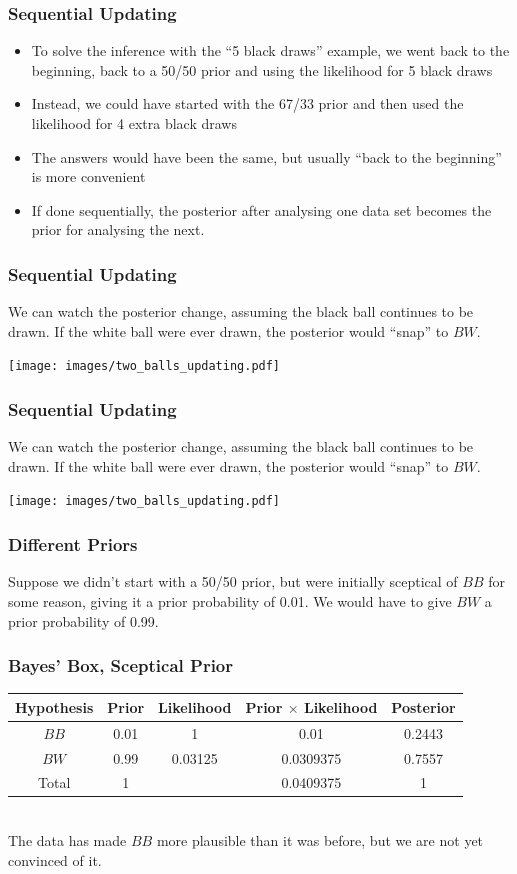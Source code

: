 \documentclass{beamer}
\begin{document}
\begin{frame}
\frametitle{Sequential Updating}

\begin{itemize}
\item To solve the inference with the ``5 black draws'' example,
we went back to the beginning, back to a 50/50 prior and
using the likelihood for 5 black draws\pause
\item Instead, we could have started with the 67/33 prior and then used
the likelihood for 4 extra black draws\pause
\item  The answers would have been the same, but usually
``back to the beginning'' is more convenient\pause
\item If done sequentially, 
the posterior after analysing one data set becomes
the prior for analysing the next.
\end{itemize}


\end{frame}

\begin{frame}
\frametitle{Sequential Updating}
We can watch the posterior change, assuming the black ball continues to be
drawn. If the white ball were ever drawn, the posterior would ``snap'' to $BW$.

\centering
\texttt{[image: images/two\_balls\_updating.pdf]}

\end{frame}


\begin{frame}
\frametitle{Sequential Updating}
We can watch the posterior change, assuming the black ball continues to be
drawn. If the white ball were ever drawn, the posterior would ``snap'' to $BW$.

\centering
\texttt{[image: images/two\_balls\_updating.pdf]}

\end{frame}



\begin{frame}
\frametitle{Different Priors}
Suppose we didn't start with a 50/50 prior, but were initially sceptical of
$BB$ for some reason, giving it a prior probability of 0.01.
We would have to give $BW$ a prior probability of 0.99.

\end{frame}

\begin{frame}
\frametitle{Bayes' Box, Sceptical Prior}
\begin{tabular}{|c|c|c|c|c|}
\hline
Hypothesis & Prior & Likelihood & Prior $\times$ Likelihood & Posterior \\
\hline
$BB$ & 0.01 & 1 & 0.01 & 0.2443 \\
$BW$ & 0.99 & 0.03125 & 0.0309375 & 0.7557 \\
\hline
Total & 1 & & 0.0409375 & 1\\
\hline
\end{tabular}
\pause
\\[0.5em]
The data has made $BB$ more plausible than it was before, but we are not yet
convinced of it.


\end{frame}
\end{document}
